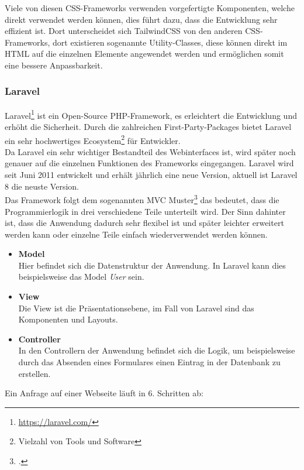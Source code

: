 Viele von diesen CSS-Frameworks verwenden vorgefertigte Komponenten, welche direkt
verwendet werden können, dies führt dazu, dass die Entwicklung sehr effizient ist.
Dort unterscheidet sich TailwindCSS von den anderen CSS-Frameworks, dort
existieren sogenannte Utility-Classes, diese können direkt im \acs*{HTML} auf
die einzelnen Elemente angewendet werden und ermöglichen somit eine bessere Anpassbarkeit.

\subsubsection{Laravel}
Laravel\footnote{\url{https://laravel.com/}} ist ein Open-Source PHP-Framework,
es erleichtert die Entwicklung und erhöht die Sicherheit. Durch die
zahlreichen First-Party-Packages bietet Laravel ein sehr hochwertiges
Ecosystem\footnote{Vielzahl von Tools und Software}
für Entwickler.\\

Da Laravel ein sehr wichtiger Bestandteil des Webinterfaces ist, wird später noch
genauer auf die einzelnen Funktionen des Frameworks eingegangen. Laravel wird
seit Juni 2011 entwickelt und erhält jährlich eine neue Version, aktuell ist
Laravel 8 die neuste Version.\\

Das Framework folgt dem sogenannten \ac*{MVC} Muster\footcite[]{stauffer2019laravel} das bedeutet, dass die
Programmierlogik in drei verschiedene Teile unterteilt wird. Der Sinn dahinter
ist, dass die Anwendung dadurch sehr flexibel ist und später leichter erweitert
werden kann oder einzelne Teile einfach wiederverwendet werden können.

\begin{itemize}
  \item \textbf{Model} \\
  Hier befindet sich die Datenstruktur der Anwendung. In Laravel kann dies
  beispielsweise das Model \textit{User} sein.
  \item \textbf{View} \\
  Die View ist die Präsentationsebene, im Fall von Laravel sind das
  Komponenten und Layouts.
  \item \textbf{Controller} \\
  In den Controllern der Anwendung befindet sich die Logik, um beispielsweise
  durch das Absenden eines Formulares einen Eintrag in der Datenbank zu
  erstellen. 
\end{itemize}

Ein Anfrage auf einer Webseite läuft in 6. Schritten ab:

